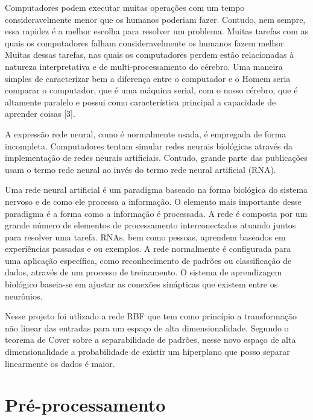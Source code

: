 \documentclass[
	article,			%
	11pt,				%
	oneside,			%
	a4paper,			%
	english,			%
	brazil,				%
	sumario=tradicional
	]{abntex2}
\begin{document}
Computadores podem executar muitas operações com um tempo consideravelmente
menor que os humanos poderiam fazer. Contudo, nem sempre, essa rapidez é a
melhor escolha para resolver um problema. Muitas tarefas com as quais os
computadores falham consideravelmente os humanos fazem melhor. Muitas dessas
tarefas, nas quais os computadores perdem estão relacionadas à natureza
interpretativa e de multi-processamento do cérebro. Uma maneira simples de
caracterizar bem a diferença entre o computador e o Homem seria comparar o
computador, que é uma máquina serial, com o nosso cérebro, que é altamente
paralelo e possui como característica principal a capacidade de aprender coisas
[3].

A expressão rede neural, como é normalmente usada, é empregada de forma
incompleta. Computadores tentam simular redes neurais biológicas através da
implementação de redes neurais artificiais. Contudo, grande parte das
publicações usam o termo rede neural ao invés do termo rede neural artificial
(RNA).

Uma rede neural artificial é um paradigma baseado na forma biológica do sistema
nervoso e de como ele processa a informação. O elemento mais importante desse
paradigma é a forma como a informação é processada. A rede é composta por um
grande número de elementos de processamento interconectados atuando juntos para
resolver uma tarefa. RNAs, bem como pessoas, aprendem baseados em experiências
passadas e ou exemplos. A rede normalmente é configurada para uma aplicação
específica, como reconhecimento de padrões ou classificação de dados, através de
um processo de treinamento. O sistema de aprendizagem biológico baseia-se em
ajustar as conexões sinápticas que existem entre os neurônios.

Nesse projeto foi utlizado a rede RBF que tem como princípio a transformação não
linear das entradas para um espaço de alta dimensionalidade. Segundo o teorema
de Cover sobre a separabilidade de padrões, nesse novo espaço de alta
dimensionalidade a probabilidade de existir um hiperplano que posso separar
linearmente os dados é maior.

\section{Pré-processamento}
\end{document}
